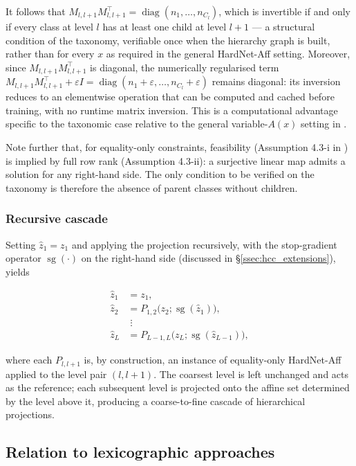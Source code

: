 It follows that $M_{l,l+1}M_{l,l+1}^{\top}=\operatorname{diag}(n_1,\dots,n_{C_l})$, which is invertible if and only if every class at level $l$ has at least one child at level $l+1$ --- a structural condition of the taxonomy, verifiable once when the hierarchy graph is built, rather than for every $x$ as required in the general HardNet-Aff setting. Moreover, since $M_{l,l+1}M_{l,l+1}^\top$ is diagonal, the numerically regularised term $M_{l,l+1}M_{l,l+1}^{\top}+\varepsilon I=\operatorname{diag}(n_1+\varepsilon,\dots,n_{C_l}+\varepsilon)$ remains diagonal: its inversion reduces to an elementwise operation that can be computed and cached before training, with no runtime matrix inversion. This is a computational advantage specific to the taxonomic case relative to the general variable-$A(x)$ setting in \cite{min2024hardnet}.

Note further that, for equality-only constraints, feasibility (Assumption 4.3-i in \cite{min2024hardnet}) is implied by full row rank (Assumption 4.3-ii): a surjective linear map admits a solution for any right-hand side. The only condition to be verified on the taxonomy is therefore the absence of parent classes without children.

\subsubsection{Recursive cascade}

Setting $\hat z_1=z_1$ and applying the projection recursively, with the stop-gradient operator $\operatorname{sg}(\cdot)$ on the right-hand side (discussed in \S\ref{ssec:hcc_extensions}), yields

\begin{align}
\hat z_1 &= z_1,\\
\hat z_2 &= P_{1,2}\big(z_2;\operatorname{sg}(\hat z_1)\big),\\
&\;\vdots\\
\hat z_L &= P_{L-1,L}\big(z_L;\operatorname{sg}(\hat z_{L-1})\big),
\end{align}

where each $P_{l,l+1}$ is, by construction, an instance of equality-only HardNet-Aff applied to the level pair $(l,l+1)$. The coarsest level is left unchanged and acts as the reference; each subsequent level is projected onto the affine set determined by the level above it, producing a coarse-to-fine cascade of hierarchical projections.

\subsection{Relation to lexicographic approaches}
\label{ssec:lexicographic}

